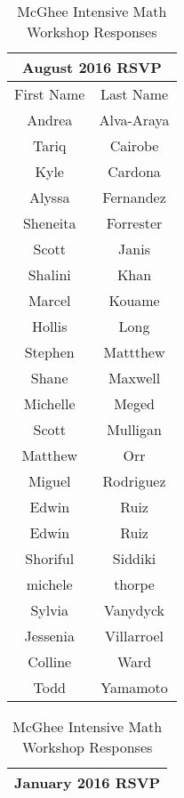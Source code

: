 \documentclass[12pt,dvipsnames]{article}
\begin{document}
	
        \begin{table}
       	\footnotesize
\caption*{McGhee Intensive Math Workshop Responses}
		\begin{tabular}{|c|c|}
			\multicolumn{2}{c}{\bfseries August 2016 RSVP}\\\hline
			First Name & Last Name\\ 
			\hline
			Andrea & Alva-Araya\\ 
			\hline
			Tariq  & Cairobe\\ 
			\hline
			Kyle & Cardona\\ 
			\hline
			Alyssa & Fernandez \\ 
			\hline
			Sheneita & Forrester\\ 
			\hline
			Scott & Janis\\ 
			\hline
			Shalini & Khan \\ 
			\hline
			Marcel & Kouame\\ 
			\hline
			Hollis & Long\\ 
			\hline
			Stephen & Mattthew\\ 
			\hline
			Shane & Maxwell\\ 
			\hline
			Michelle & Meged\\ 
			\hline
			Scott & Mulligan\\ 
			\hline
			Matthew & Orr\\ 
			\hline
			Miguel & Rodriguez\\ 
			\hline
			Edwin & Ruiz\\ 
			\hline
			Edwin & Ruiz\\ 
			\hline
			Shoriful & Siddiki\\ 
			\hline
			michele & thorpe\\ 
			\hline
			Sylvia & Vanydyck\\ 
			\hline
			Jessenia & Villarroel\\ 
			\hline
			Colline  & Ward \\ 
			\hline
			Todd & Yamamoto\\
			\hline\end{tabular}
 \hfill
	\begin{tabular}{|c|c|}
			\multicolumn{2}{c}{\bfseries January 2016 RSVP}\\\hline

\end{tabular}
\end{table}
\end{document}
